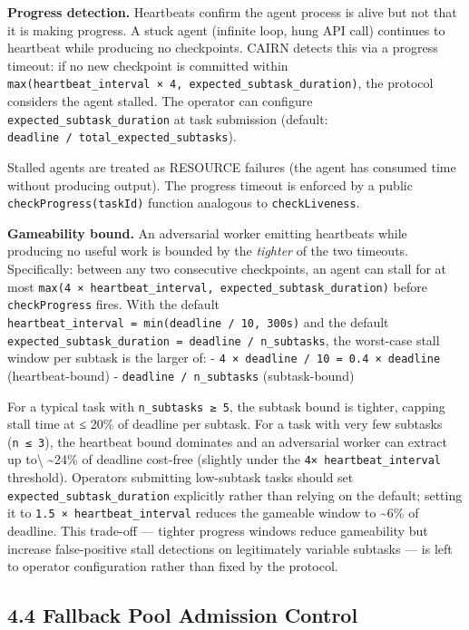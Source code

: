 \documentclass[
  10pt,
]{article}
\begin{document}
\textbf{Progress detection.} Heartbeats confirm the agent process is
alive but not that it is making progress. A stuck agent (infinite loop,
hung API call) continues to heartbeat while producing no checkpoints.
CAIRN detects this via a progress timeout: if no new checkpoint is
committed within
\texttt{max(heartbeat\_interval\ ×\ 4,\ expected\_subtask\_duration)},
the protocol considers the agent stalled. The operator can configure
\texttt{expected\_subtask\_duration} at task submission (default:
\texttt{deadline\ /\ total\_expected\_subtasks}).

Stalled agents are treated as RESOURCE failures (the agent has consumed
time without producing output). The progress timeout is enforced by a
public \texttt{checkProgress(taskId)} function analogous to
\texttt{checkLiveness}.

\textbf{Gameability bound.} An adversarial worker emitting heartbeats
while producing no useful work is bounded by the \emph{tighter} of the
two timeouts. Specifically: between any two consecutive checkpoints, an
agent can stall for at most
\texttt{max(4\ ×\ heartbeat\_interval,\ expected\_subtask\_duration)}
before \texttt{checkProgress} fires. With the default
\texttt{heartbeat\_interval\ =\ min(deadline\ /\ 10,\ 300s)} and the
default
\texttt{expected\_subtask\_duration\ =\ deadline\ /\ n\_subtasks}, the
worst-case stall window per subtask is the larger of: -
\texttt{4\ ×\ deadline\ /\ 10\ =\ 0.4\ ×\ deadline} (heartbeat-bound) -
\texttt{deadline\ /\ n\_subtasks} (subtask-bound)

For a typical task with \texttt{n\_subtasks\ ≥\ 5}, the subtask bound is
tighter, capping stall time at ≤ 20\% of deadline per subtask. For a
task with very few subtasks (\texttt{n\ ≤\ 3}), the heartbeat bound
dominates and an adversarial worker can extract up to\textbackslash{}
\textasciitilde24\% of deadline cost-free (slightly under the
\texttt{4×\ heartbeat\_interval} threshold). Operators submitting
low-subtask tasks should set \texttt{expected\_subtask\_duration}
explicitly rather than relying on the default; setting it to
\texttt{1.5\ ×\ heartbeat\_interval} reduces the gameable window to
\textasciitilde6\% of deadline. This trade-off --- tighter progress
windows reduce gameability but increase false-positive stall detections
on legitimately variable subtasks --- is left to operator configuration
rather than fixed by the protocol.

\hypertarget{fallback-pool-admission-control}{%
\subsection{4.4 Fallback Pool Admission
Control}\label{fallback-pool-admission-control}}
\end{document}

